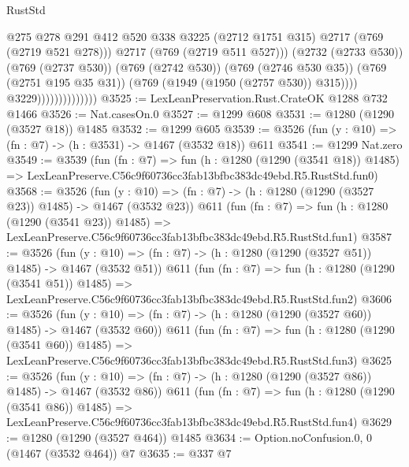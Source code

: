 \begin{lexlean}{RustStd}
\begin{coremodule}
                                        @275
                                        @278
                                        @291
                                        @412
                                        @520
                                        @338
                                        @3225
                                        (@2712 @1751 @315)
                                        @2717
                                        (@769 (@2719 @521 @278)))
                                      @2717
                                      (@769 (@2719 @511 @527)))
                                    (@2732 (@2733 @530))
                                    (@769 (@2737 @530))
                                    (@769 (@2742 @530))
                                    (@769 (@2746 @530 @35))
                                    (@769 (@2751 @195 @35 @31))
                                    (@769 (@1949 (@1950 (@2757 @530)) @315))))
                                @3229))))))))))))))
@3525 := LexLeanPreservation.Rust.CrateOK @1288 @732 @1466
@3526 := Nat.casesOn.{0}
@3527 := @1299 @608
@3531 := @1280 (@1290 (@3527 @18)) @1485
@3532 := @1299 @605
@3539 := @3526 (fun (y : @10) => (fn : @7) -> (h : @3531) -> @1467 (@3532 @18)) @611
@3541 := @1299 Nat.zero
@3549 := @3539
    (fun (fn : @7) =>
    fun (h : @1280 (@1290 (@3541 @18)) @1485) =>
    LexLeanPreserve.C56c9f60736cc3fab13bfbc383dc49ebd.R5.RustStd.fun0)
@3568 := @3526
    (fun (y : @10) => (fn : @7) -> (h : @1280 (@1290 (@3527 @23)) @1485) -> @1467 (@3532 @23))
    @611
    (fun (fn : @7) =>
    fun (h : @1280 (@1290 (@3541 @23)) @1485) =>
    LexLeanPreserve.C56c9f60736cc3fab13bfbc383dc49ebd.R5.RustStd.fun1)
@3587 := @3526
    (fun (y : @10) => (fn : @7) -> (h : @1280 (@1290 (@3527 @51)) @1485) -> @1467 (@3532 @51))
    @611
    (fun (fn : @7) =>
    fun (h : @1280 (@1290 (@3541 @51)) @1485) =>
    LexLeanPreserve.C56c9f60736cc3fab13bfbc383dc49ebd.R5.RustStd.fun2)
@3606 := @3526
    (fun (y : @10) => (fn : @7) -> (h : @1280 (@1290 (@3527 @60)) @1485) -> @1467 (@3532 @60))
    @611
    (fun (fn : @7) =>
    fun (h : @1280 (@1290 (@3541 @60)) @1485) =>
    LexLeanPreserve.C56c9f60736cc3fab13bfbc383dc49ebd.R5.RustStd.fun3)
@3625 := @3526
    (fun (y : @10) => (fn : @7) -> (h : @1280 (@1290 (@3527 @86)) @1485) -> @1467 (@3532 @86))
    @611
    (fun (fn : @7) =>
    fun (h : @1280 (@1290 (@3541 @86)) @1485) =>
    LexLeanPreserve.C56c9f60736cc3fab13bfbc383dc49ebd.R5.RustStd.fun4)
@3629 := @1280 (@1290 (@3527 @464)) @1485
@3634 := Option.noConfusion.{0, 0} (@1467 (@3532 @464)) @7
@3635 := @337 @7

\end{coremodule}
\end{lexlean}
